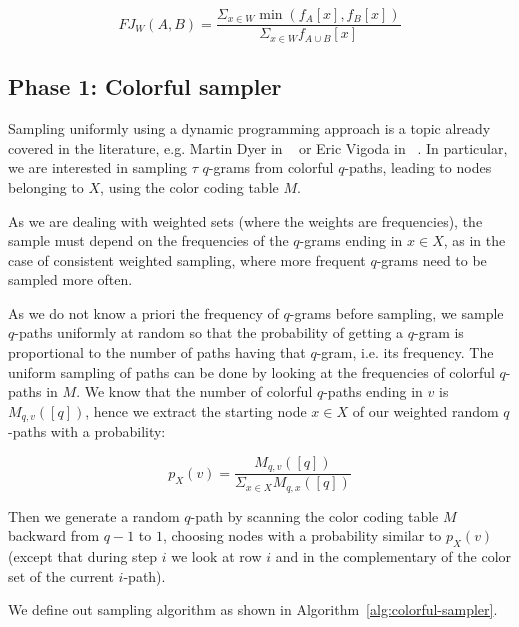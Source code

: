 \begin{equation}\label{fj-w}
	FJ_{W}(A,B) = \frac{ \Sigma_{x \in W} \min(f_{A}[x], f_{B}[x]) }{ \Sigma_{x \in W} f_{A \cup B}[x] }
\end{equation}

\subsection*{Phase 1: Colorful sampler}

Sampling uniformly using a dynamic programming approach is a topic already covered in the literature, e.g. Martin Dyer in ~\cite{Dyer:2003:ACD:780542.780643} or Eric Vigoda in ~\cite{Vigoda2010LectureNO}. In particular, we are interested in sampling $\tau$ $q$-grams from colorful $q$-paths, leading to nodes belonging to $X$, using the color coding table $M$.\bigskip

As we are dealing with weighted sets (where the weights are frequencies), the sample must depend on the frequencies of the $q$-grams ending in $x \in X$, as in the case of consistent weighted sampling, where more frequent $q$-grams need to be sampled more often.
 
As we do not know a priori the frequency of $q$-grams before sampling, we sample $q$-paths uniformly at random so that the probability of getting a $q$-gram is proportional to the number of paths having that $q$-gram, i.e. its frequency. The uniform sampling of paths can be done by looking at the frequencies of colorful $q$-paths in $M$. We know that the number of colorful $q$-paths ending in $v$ is $M_{q,v}([q])$, hence we extract the starting node $x \in X$ of our weighted random $q$-paths with a probability:\bigskip

\begin{equation}
	p_{X}(v) = \frac{ M_{q,v}([q]) }{ \Sigma_{x \in X}{M_{q, x}([q])} }
\end{equation}

\bigskip

Then we generate a random $q$-path by scanning the color coding table $M$ backward from $q-1$ to $1$, choosing nodes with a probability similar to $p_{X}(v)$ (except that during step $i$ we look at row $i$ and in the complementary of the color set of the current $i$-path).\bigskip

\clearpage

We define out sampling algorithm as shown in Algorithm~\ref{alg:colorful-sampler}.

